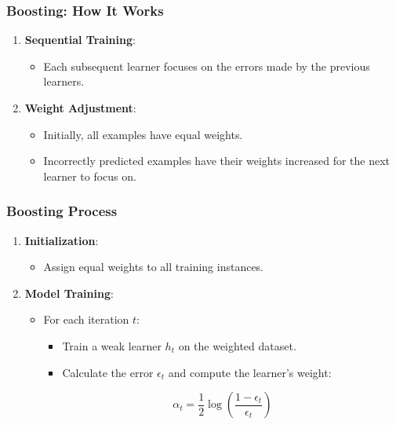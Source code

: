 \documentclass[aspectratio=169]{beamer}
\begin{document}
\begin{frame}[fragile]
  \frametitle{Boosting: How It Works}
  \begin{enumerate}
    \item \textbf{Sequential Training}:
      \begin{itemize}
        \item Each subsequent learner focuses on the errors made by the previous learners.
      \end{itemize}
    \item \textbf{Weight Adjustment}:
      \begin{itemize}
        \item Initially, all examples have equal weights.
        \item Incorrectly predicted examples have their weights increased for the next learner to focus on.
      \end{itemize}
  \end{enumerate}
\end{frame}

\begin{frame}[fragile]
  \frametitle{Boosting Process}
  \begin{enumerate}
    \item \textbf{Initialization}:
      \begin{itemize}
        \item Assign equal weights to all training instances.
      \end{itemize}
    \item \textbf{Model Training}:
      \begin{itemize}
        \item For each iteration $t$:
          \begin{itemize}
            \item Train a weak learner $h_t$ on the weighted dataset.
            \item Calculate the error $\epsilon_t$ and compute the learner's weight:
            \end{itemize}
            \begin{equation}
              \alpha_t = \frac{1}{2} \log\left(\frac{1 - \epsilon_t}{\epsilon_t}\right)
            \end{equation}
      \end{itemize}
  \end{enumerate}
\end{frame}
\end{document}
